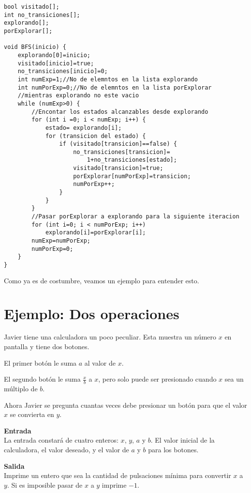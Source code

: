 \begin{minipage}{\linewidth}
\begin{lstlisting}
bool visitado[];
int no_transiciones[];
explorando[];
porExplorar[];

void BFS(inicio) {
	explorando[0]=inicio;
	visitado[inicio]=true;
	no_transiciones[inicio]=0;
	int numExp=1;//No de elemntos en la lista explorando
	int numPorExp=0;//No de elemntos en la lista porExplorar
	//mientras explorando no este vacio
	while (numExp>0) {
		//Encontar los estados alcanzables desde explorando
		for (int i =0; i < numExp; i++) {
			estado= explorando[i];
			for (transicion del estado) {
				if (visitado[transicion]==false) {
					no_transiciones[transicion]=
						1+no_transiciones[estado];
					visitado[transicion]=true;
					porExplorar[numPorExp]=transicion;
					numPorExp++;
				}
			}
		}
		//Pasar porExplorar a explorando para la siguiente iteracion
		for (int i=0; i < numPorExp; i++) 
			explorando[i]=porExplorar[i];
		numExp=numPorExp;
		numPorExp=0;
	}
}
\end{lstlisting}
\end{minipage}

Como ya es de costumbre, veamos un ejemplo para entender esto.
\section*{Ejemplo: Dos operaciones}
Javier tiene una calculadora un poco peculiar. Esta muestra un número \(x\) en pantalla y tiene dos botones.

\begin{plimits}
	\item El primer botón le suma \(a\) al valor de \(x\).
	\item El segundo botón le  suma \(\frac{x}{b}\) a \(x\), pero solo puede ser presionado cuando \(x\) sea un múltiplo de \(b\).
\end{plimits}

Ahora Javier se pregunta cuantas veces debe presionar un botón para que el valor \(x\) se convierta en \(y\).

\textbf{Entrada}\\
La entrada constará de cuatro enteros: \(x\), \(y\), \(a\) y \(b\). El valor inicial de la calculadora, el valor deseado, y el valor de \(a\) y \(b\) para los botones.

\textbf{Salida}\\
Imprime un entero que sea la cantidad de pulsaciones mínima para convertir \(x\) a \(y\). Si es imposible pasar de \(x\) a \(y\) imprime \(-1\).

